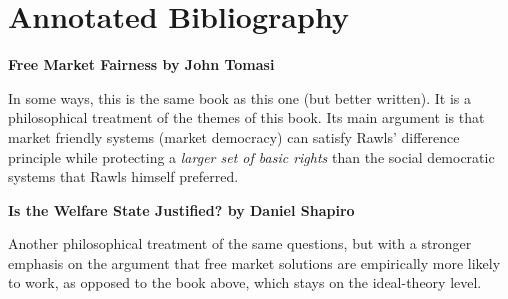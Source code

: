 \def\book#1{\bigskip\textbf{#1}\par}%
\chapter{Annotated Bibliography}

\book{Free Market Fairness by John Tomasi}

In some ways, this is the same book as this one (but better written). It is a
philosophical treatment of the themes of this book. Its main argument is that
market friendly systems (market democracy) can satisfy Rawls' difference
principle while protecting a \emph{larger set of basic rights} than the social
democratic systems that Rawls himself preferred.

\book{Is the Welfare State Justified? by Daniel Shapiro}

Another philosophical treatment of the same questions, but with a stronger
emphasis on the argument that free market solutions are empirically more likely
to work, as opposed to the book above, which stays on the ideal-theory level.

